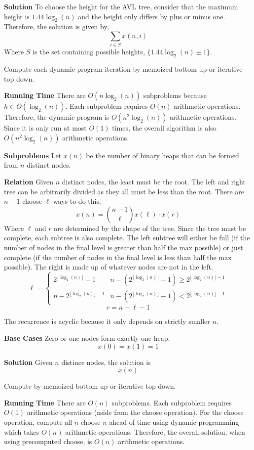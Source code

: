 \documentclass[12pt,twoside]{article}
\begin{document}
\begin{problems}
\begin{problemparts}
{\bf Solution} To choose the height for the AVL tree, consider that the
maximum height is $1.44 \log_2(n)$ and the height only differs by plus or
minus one. Therefore, the solution is given by,
$$ \sum_{i \in S} x(n, i) $$
Where $S$ is the set containing possible heights, $\{1.44 \log_2(n) \pm 1\}$.

Compute each dynamic program iteration by memoized bottom up or iterative top
down.

{\bf Running Time} There are $O(n \log_2(n))$ subproblems because $h \in
O(\log_2(n))$. Each subproblem requires $O(n)$ arithmetic operations.
Therefore, the dynamic program is $O(n^2 \log_2(n))$ arithmetic operations.
Since it is only run at most $O(1)$ times, the overall algorithm is also
$O(n^2 \log_2(n))$ arithmetic operations.

\problempart %
{\bf Subproblems} Let $x(n)$ be the number of binary heaps that can be formed
from $n$ distinct nodes.

{\bf Relation} Given $n$ distinct nodes, the least must be the root. The left
and right tree can be arbitrarily divided as they all must be less than the
root. There are $n - 1$ choose $\ell$ ways to do this.
$$ x(n) = \binom{n - 1}{\ell} x(\ell) \cdot x(r) $$
Where $\ell$ and $r$ are determined by the shape of the tree. Since the tree
must be complete, each subtree is also complete. The left subtree will either
be full (if the number of nodes in the final level is greater than half the
max possible) or just complete (if the number of nodes in the final level is
less than half the max possible). The right is made up of whatever nodes are
not in the left.
$$ \ell = \begin{cases}
  2^{\lfloor \log_2(n)\rfloor} - 1 & n - (2^{\lfloor \log_2(n)\rfloor} - 1)
  \geq 2^{\lfloor \log_2(n)\rfloor - 1} \\
  n - 2^{\lfloor \log_2(n)\rfloor - 1} & n - (2^{\lfloor \log_2(n)\rfloor} -
  1) < 2^{\lfloor \log_2(n)\rfloor - 1}
\end{cases} $$
$$ r = n - \ell - 1 $$

The recurrence is acyclic because it only depends on strictly smaller $n$.

{\bf Base Cases} Zero or one nodes form exactly one heap.
$$ x(0) = x(1) = 1 $$

{\bf Solution} Given $n$ distince nodes, the solution is
$$ x(n) $$

Compute by memoized bottom up or iterative top down.

{\bf Running Time} There are $O(n)$ subproblems. Each subproblem requires
$O(1)$ arithmetic operations (aside from the choose operation). For the
choose operation, compute all $n$ choose $n$ ahead of time using dynamic
programming which takes $O(n)$ arithmetic operations. Therefore, the overall
solution, when using precomputed choose, is $O(n)$ arithmetic operations.


\end{problemparts}
\end{problems}
\end{document}
